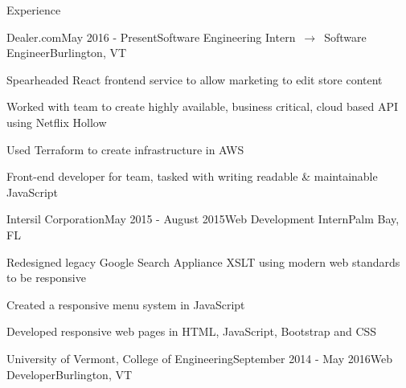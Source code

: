 \documentclass{resume} %
\begin{document}

\begin{rSection}{Experience}


\begin{rSubsection}{Dealer.com}{May 2016 - Present}{Software Engineering Intern~$\rightarrow$~Software Engineer}{Burlington, VT}

\item Spearheaded React frontend service to allow marketing to edit store content
\item Worked with team to create highly available, business critical, cloud based API using Netflix Hollow
\item Used Terraform to create infrastructure in AWS
\item Front-end developer for team, tasked with writing readable \& maintainable JavaScript

\end{rSubsection}


\begin{rSubsection}{Intersil Corporation}{May 2015 - August 2015}{Web Development Intern}{Palm Bay, FL}

\item Redesigned legacy Google Search Appliance XSLT using modern web standards to be responsive
\item Created a responsive menu system in JavaScript
\item Developed responsive web pages in HTML, JavaScript, Bootstrap and CSS

\end{rSubsection}


\begin{rSubsection}{University of Vermont, College of Engineering}{September 2014 - May 2016}{Web Developer}{Burlington, VT}


\end{rSubsection}
\end{rSection}
\end{document}
